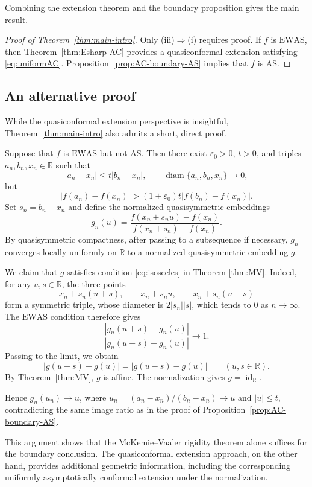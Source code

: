 \documentclass[11pt]{amsart}
\numberwithin{equation}{section}
\theoremstyle{definition} %
\theoremstyle{remarkstyle}
\begin{document}
Combining the extension theorem and the boundary proposition gives the main
result.

\begin{proof}[Proof of Theorem~\ref{thm:main-intro}]
Only (iii)$\Rightarrow$(i) requires proof.  
If $f$ is $\mathrm{EWAS}$, then Theorem~\ref{thm:Esharp-AC} provides a quasiconformal extension satisfying
\eqref{eq:uniformAC}.  
Proposition~\ref{prop:AC-boundary-AS} implies that $f$ is $\mathrm{AS}$.
\end{proof}


\subsection{An alternative proof}
While the quasiconformal extension perspective is insightful, Theorem~\ref{thm:main-intro} also admits a short, direct proof. 

Suppose that $f$ is $\mathrm{EWAS}$ but not $\mathrm{AS}$.  
Then there exist $\varepsilon_0>0$, $t>0$, and triples $a_n,b_n,x_n\in\mathbb R$ such that
\[
|a_n-x_n|\leq t|b_n-x_n|,\qquad\operatorname{diam}\{a_n,b_n,x_n\}\to 0,
\]
but
\[
|f(a_n)-f(x_n)|
>(1+\varepsilon_0)t|f(b_n)-f(x_n)|.
\]
Set $s_n=b_n-x_n$ and define the normalized quasisymmetric embeddings
\[
g_n(u)=\frac{f(x_n+s_nu)-f(x_n)}{f(x_n+s_n)-f(x_n)}.
\]
By quasisymmetric compactness, after passing to a subsequence if necessary, $g_n$ converges locally uniformly on $\mathbb R$ to a normalized quasisymmetric embedding $g$.

We claim that $g$ satisfies condition \eqref{eq:isosceles} in Theorem \ref{thm:MV}.  
Indeed, for any $u,s\in\mathbb R$, the three points
\[
x_n+s_n(u+s),\qquad x_n+s_nu,\qquad x_n+s_n(u-s)
\]
form a symmetric triple, whose diameter is $2|s_n||s|$, which tends to $0$ as $n \to \infty$.  
The $\mathrm{EWAS}$ condition therefore gives
\[
\frac{|g_n(u+s)-g_n(u)|}{|g_n(u-s)-g_n(u)|}\to 1.
\]
Passing to the limit, we obtain
\[
|g(u+s)-g(u)|=|g(u-s)-g(u)|\qquad(u,s\in\mathbb R).
\]
By Theorem~\ref{thm:MV}, $g$ is affine.  
The normalization gives $g=\operatorname{id}_{\mathbb R}$.

Hence $g_n(u_n)\to u$, where $u_n=(a_n-x_n)/(b_n-x_n)\to u$ and $|u|\leq t$, contradicting the same image ratio as in the proof of Proposition~\ref{prop:AC-boundary-AS}.

This argument shows that the McKemie--Vaaler rigidity theorem alone
suffices for the boundary conclusion. The quasiconformal extension approach, on the other hand, provides additional geometric information, including the corresponding uniformly asymptotically conformal extension under the normalization.
\end{document}
